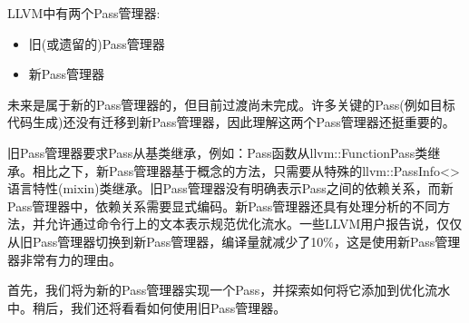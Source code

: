 LLVM中有两个Pass管理器: \par

\begin{itemize}
\item 旧(或遗留的)Pass管理器
\item 新Pass管理器
\end{itemize}

未来是属于新的Pass管理器的，但目前过渡尚未完成。许多关键的Pass(例如目标代码生成)还没有迁移到新Pass管理器，因此理解这两个Pass管理器还挺重要的。\par

旧Pass管理器要求Pass从基类继承，例如：Pass函数从llvm::FunctionPass类继承。相比之下，新Pass管理器基于概念的方法，只需要从特殊的llvm::PassInfo<>语言特性(mixin)类继承。旧Pass管理器没有明确表示Pass之间的依赖关系，而新Pass管理器中，依赖关系需要显式编码。新Pass管理器还具有处理分析的不同方法，并允许通过命令行上的文本表示规范优化流水。一些LLVM用户报告说，仅仅从旧Pass管理器切换到新Pass管理器，编译量就减少了10\%，这是使用新Pass管理器非常有力的理由。\par

首先，我们将为新的Pass管理器实现一个Pass，并探索如何将它添加到优化流水中。稍后，我们还将看看如何使用旧Pass管理器。\par

